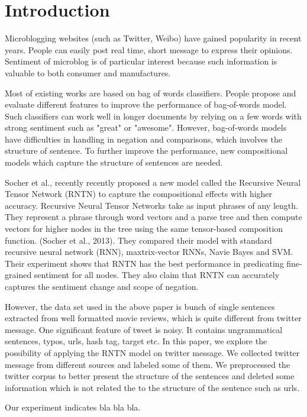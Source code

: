 \section{Introduction}

Microblogging websites (such as Twitter, Weibo) have gained popularity in recent years. People can easily post real time, short message to express their opinions. 
Sentiment of microblog is of particular interest because such information is valuable to both consumer and
manufactures.

Most of existing works are based on bag of words classifiers. People propose and evaluate different features to improve the performance of bag-of-words model. Such classifiers can work well in longer documents by relying on a few words with strong sentiment such as "great" or "awesome". However, bag-of-words models have difficulties in handling in negation and comparisons, which involves the structure of sentence. To further improve the performance, new compositional models which capture the structure of sentences are needed. 

Socher et al., recently recently proposed a new model called the Recursive Neural Tensor Network (RNTN) to capture the compositional effects with higher accuracy. 
Recursive Neural Tensor Networks take as input phrases of any length. 
They represent a phrase through word vectors and a parse tree and then compute vectors for higher nodes in the tree using the same tensor-based composition function. (Socher et al., 2013). They compared their model with standard recursive neural network (RNN), maxtrix-vector RNNs, Navie Bayes and SVM. Their experiment shows that RNTN has the best performance in predicating fine-grained sentiment for all nodes. They also claim that RNTN can accurately captures the sentiment change and scope of negation. 

However, the data set used in the above paper is bunch of single sentences extracted from well formatted movie reviews, which is quite different from twitter message. One significant feature of tweet is noisy. It contains ungrammatical sentences, typos, urls, hash tag, target etc. In this paper, we explore the possibility of applying the RNTN model on twitter message. We collected twitter message from different sources and labeled some of them. We preprocessed the twitter corpus to better present the structure of the sentences and deleted some information which is not related the to the structure of the sentence such as urls.  

Our experiment indicates bla bla bla. 

\newpage